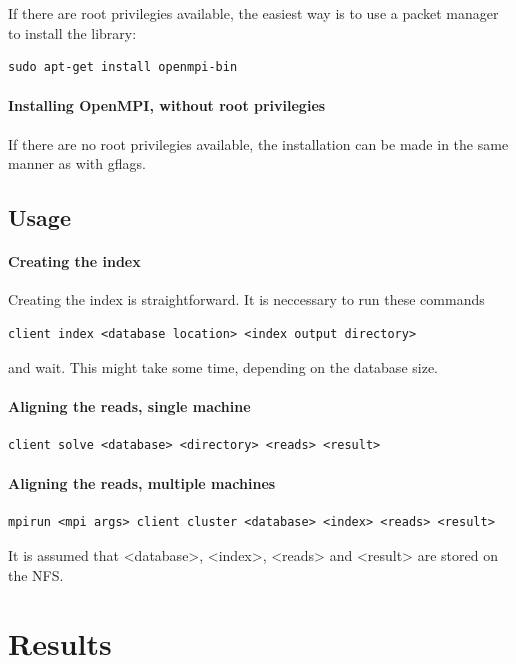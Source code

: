 \documentclass[times, utf8, diplomski]{fer}
\begin{document}
If there are root privilegies available, the easiest way is to use a packet manager to install the library:
\begin{lstlisting}
sudo apt-get install openmpi-bin
\end{lstlisting}

\subsubsection{Installing OpenMPI, without root privilegies}
If there are no root privilegies available, the installation can be made in the same manner as with gflags.

\section{Usage}

\subsubsection{Creating the index}
Creating the index is straightforward. It is neccessary to run these commands
\begin{lstlisting}
client index <database location> <index output directory>
\end{lstlisting}
and wait. This might take some time, depending on the database size.

\subsubsection{Aligning the reads, single machine}
\begin{lstlisting}
client solve <database> <directory> <reads> <result>
\end{lstlisting}

\subsubsection{Aligning the reads, multiple machines}
\begin{lstlisting}
mpirun <mpi args> client cluster <database> <index> <reads> <result>
\end{lstlisting}
It is assumed that <database>, <index>, <reads> and <result> are stored on the NFS.

\chapter{Results}
\end{document}

